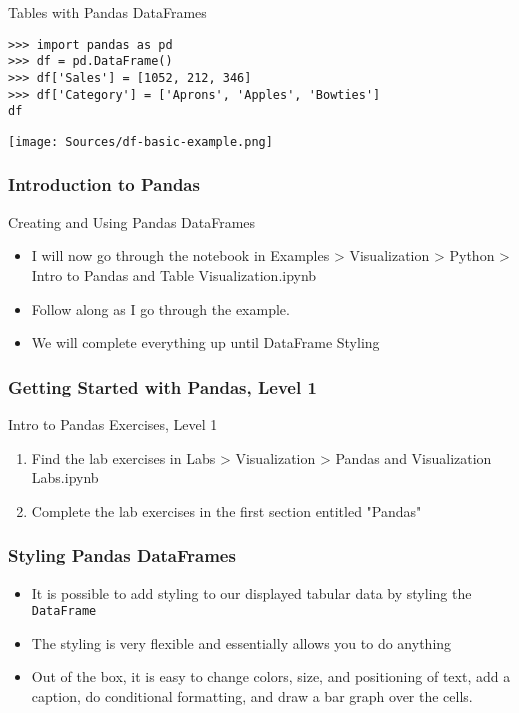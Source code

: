 \documentclass[handout, 11pt]{beamer}
\begin{document}
\begin{section}[Pandas]{Tables with Pandas DataFrames}
\begin{frame}[fragile]
\begin{verbatim}
>>> import pandas as pd
>>> df = pd.DataFrame()
>>> df['Sales'] = [1052, 212, 346]
>>> df['Category'] = ['Aprons', 'Apples', 'Bowties']
df

\end{verbatim}
\texttt{[image: Sources/df-basic-example.png]}
\end{frame}
\begin{frame}
\frametitle{Introduction to Pandas}
{
\begin{block}{Creating and Using Pandas DataFrames}
\begin{itemize}
\item I will now go through the notebook in Examples > Visualization > Python > Intro to Pandas and Table Visualization.ipynb
\item Follow along as I go through the example.
\item We will complete everything up until DataFrame Styling
\end{itemize}
\end{block}
}
\end{frame}
\begin{frame}
\frametitle{Getting Started with Pandas, Level 1}
{
\begin{block}{Intro to Pandas Exercises, Level 1}
\begin{enumerate}
\item Find the lab exercises in Labs > Visualization > Pandas and Visualization Labs.ipynb
\item Complete the lab exercises in the first section entitled "Pandas"
\end{enumerate}
\vfill
\end{block}
}
\label{labs:intro-pandas-1}
\end{frame}
\begin{frame}
\frametitle{Styling Pandas DataFrames}
\begin{itemize}
\item It is possible to add styling to our displayed tabular data by styling the
\texttt{DataFrame}
\vfill
\item The styling is very flexible and essentially allows you to do anything
\vfill
\item Out of the box, it is easy to change colors, size, and positioning of text, add a caption, do conditional formatting, and draw a bar graph over the cells.
\end{itemize}
\end{frame}

\end{section}
\end{document}
